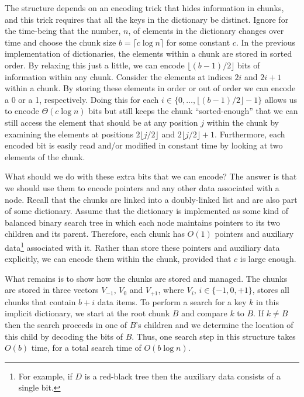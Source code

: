 The structure depends on an encoding trick that hides information in
chunks, and this trick requires that all the keys in the dictionary be
distinct.  Ignore for the time-being that the number, $n$, of elements
in the dictionary changes over time and choose the chunk size $b= \lceil
c\log n\rceil$ for some constant $c$. In the previous implementation of
dictionaries, the elements within a chunk are stored in sorted order. By
relaxing this just a little, we can encode $\lfloor (b-1)/2 \rfloor$
bits of information within any chunk.  Consider the elements at indices
$2i$ and $2i+1$ within a chunk.  By storing these elements in order or
out of order we can encode a 0 or a 1, respectively.  Doing this for
each $i\in\{0,\ldots,\lfloor (b-1)/2\rfloor-1\}$ allows us to encode
$\Theta(c\log n)$ bits but still keeps the chunk ``sorted-enough'' that
we can still access the element that should be at any position $j$ within
the chunk by examining the elements at positions $2\lfloor j/2\rfloor$ and
$2\lfloor j/2\rfloor +1$.  Furthermore, each encoded bit is easily read
and/or modified in constant time by looking at two elements of the chunk.

What should we do with these extra bits that we can encode?  The answer is
that we should use them to encode pointers and any other data associated
with a node.  Recall that the chunks are linked into a doubly-linked list
and are also part of some dictionary.  Assume that the dictionary is
implemented as some kind of balanced binary search tree in which each node
maintains pointers to its two children and its parent.  Therefore, each
chunk has $O(1)$ pointers and auxiliary data\footnote{For example, if $D$
is a red-black tree then the auxiliary data consists of a single bit.}
associated with it. Rather than store these pointers and auxiliary data
explicitly, we can encode them within the chunk, provided that $c$ is large
enough.

What remains is to show how the chunks are stored and managed.  The chunks
are stored in three vectors $V_{-1}$, $V_{0}$ and $V_{+1}$, where $V_i$,
$i\in\{-1,0,+1\}$, stores all chunks that contain $b+i$ data items.  To
perform a search for a key $k$ in this implicit dictionary, we start at the
root chunk $B$ and compare $k$ to $B$.  If $k\neq B$ then the search
proceeds in one of $B$'s children and we determine the location of this
child by decoding the bits of $B$.  Thus, one search step in this structure
takes $O(b)$ time, for a total search time of $O(b\log n)$.

